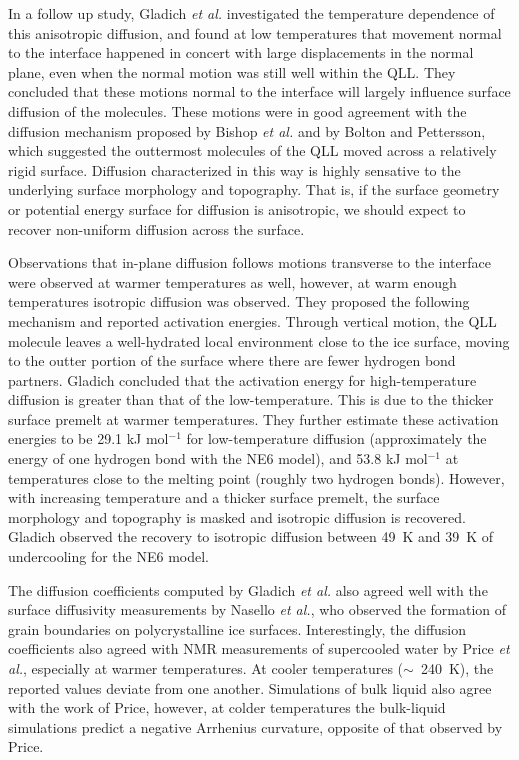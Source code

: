 In a follow up study, Gladich \textit{et al.} investigated the
temperature dependence of this anisotropic diffusion, and found at low
temperatures that movement normal to the interface happened in concert
with large displacements in the normal plane, even when the normal
motion was still well within the QLL.\cite{Gladich2011} They concluded
that these motions normal to the interface will largely influence
surface diffusion of the molecules. These motions were in good
agreement with the diffusion mechanism proposed by Bishop \textit{et
  al.}\cite{Bishop2009} and by Bolton and Pettersson\cite{Bolton2000},
which suggested the outtermost molecules of the QLL moved across a
relatively rigid surface. Diffusion characterized in this way is
highly sensative to the underlying surface morphology and topography.
That is, if the surface geometry or potential energy surface for
diffusion is anisotropic, we should expect to recover non-uniform
diffusion across the surface.

Observations that in-plane diffusion follows motions transverse to the
interface were observed at warmer temperatures as well, however, at
warm enough temperatures isotropic diffusion was
observed.\cite{Gladich2011,Gladich2015} They proposed the following
mechanism and reported activation energies. Through vertical motion,
the QLL molecule leaves a well-hydrated local environment close to the
ice surface, moving to the outter portion of the surface where there
are fewer hydrogen bond partners. Gladich concluded that the
activation energy for high-temperature diffusion is greater than that
of the low-temperature. This is due to the thicker surface premelt at
warmer temperatures.  They further estimate these activation energies
to be 29.1 kJ mol$^{-1}$ for low-temperature diffusion (approximately
the energy of one hydrogen bond with the NE6 model), and 53.8 kJ
mol$^{-1}$ at temperatures close to the melting point (roughly two
hydrogen bonds).  However, with increasing temperature and a thicker
surface premelt, the surface morphology and topography is masked and
isotropic diffusion is recovered. Gladich observed the recovery to
isotropic diffusion between 49~K and 39~K of undercooling for the NE6
model.

The diffusion coefficients computed by Gladich \textit{et al.} also
agreed well with the surface diffusivity measurements by Nasello
\textit{et al.}, who observed the formation of grain boundaries on
polycrystalline ice surfaces.\cite{Nasello2007} Interestingly, the
diffusion coefficients also agreed with NMR measurements of
supercooled water by Price \textit{et al.}, especially at warmer
temperatures. \cite{Price1999} At cooler temperatures ($\sim$~240~K),
the reported values deviate from one another. Simulations of bulk
liquid also agree with the work of Price, however, at colder
temperatures the bulk-liquid simulations predict a negative Arrhenius
curvature, opposite of that observed by
Price.\cite{Picaud2006,Mahoney2001}

